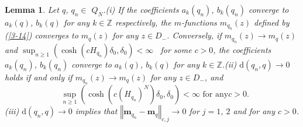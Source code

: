 \documentclass[a4paper]{article}%
\newtheorem{lemma}{Lemma}
\begin{document}
\begin{lemma}
\label{l3-7}Let $q$, $q_{n}\in$ $Q_{N}$.\newline(i) If the coefficients
$a_{k}\left(  q_{n}\right)  $, $b_{k}\left(  q_{n}\right)  $ converge to
$a_{k}\left(  q\right)  $, $b_{k}\left(  q\right)  $ for any $k\in\mathbb{Z}$
respectively, the $m$-functions $m_{q_{n}}\left(  z\right)  $ defined by
(\ref{3-14}) converges to $m_{q}\left(  z\right)  $ for any $z\in D_{-}$.
Conversely, if $m_{q_{n}}\left(  z\right)  \rightarrow m_{q}\left(  z\right)
$ and $\sup_{n\geq1}\left(  \cosh\left(  cH_{q_{n}}\right)  \delta_{0}%
,\delta_{0}\right)  <\infty$ \ for some $c>0$, the coefficients $a_{k}\left(
q_{n}\right)  $, $b_{k}\left(  q_{n}\right)  $ converge to $a_{k}\left(
q\right)  $, $b_{k}\left(  q\right)  $ for any $k\in\mathbb{Z}$.\newline(ii)
$\mathrm{d}\left(  q_{n},q\right)  \rightarrow0$ holds if and only if
$m_{q_{n}}\left(  z\right)  \rightarrow m_{q}\left(  z\right)  $ for any $z\in
D_{-}$, and
\begin{equation}
\text{ }\sup_{n\geq1}\left(  \cosh\left(  c\left(  H_{q_{n}}\right)
^{N}\right)  \delta_{0},\delta_{0}\right)  <\infty\text{ \ for any
}c>0\text{.} \label{4-3}%
\end{equation}
(iii) $\mathrm{d}\left(  q_{n},q\right)  \rightarrow0$ implies that
$\left\Vert \boldsymbol{m}_{q_{n}}-\boldsymbol{m}_{q}\right\Vert
_{c,j}\rightarrow0$ for $j=1$, $2$ and for any $c>0$.
\end{lemma}
\end{document}
